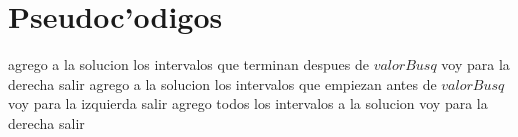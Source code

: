 \section{Pseudoc'odigos}
\begin{algorithmic}[1]
		\STATE agrego a la solucion los intervalos que terminan despues de $valorBusq$
				\STATE voy para la derecha
		\ELSE
				\STATE salir
		\ENDIF
		\STATE agrego a la solucion los intervalos que empiezan antes de $valorBusq$
				\STATE voy para la izquierda
		\ELSE
				\STATE salir
		\ENDIF
	\ELSE
		\STATE agrego todos los intervalos a la solucion
				\STATE voy para la derecha
		\ELSE
				\STATE salir
		\ENDIF
	\ENDIF
\ENDWHILE
\end{algorithmic}
